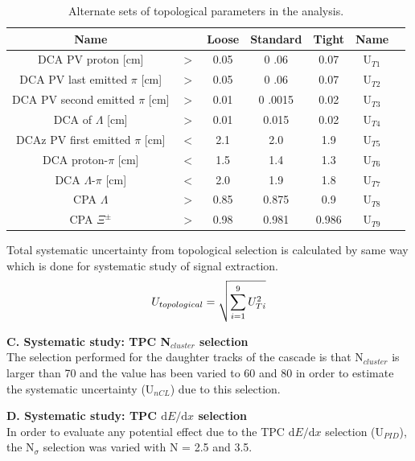 \begin{table}[htp]
\begin{center}
\begin{tabular}{|c|c|c|c|c|c|c|}
\hline
Name &  & Loose  &   Standard & Tight & Name\\
\hline
\hline

DCA PV proton [cm]& $>$ & 0.05 & 0 .06 & 0.07 & U$_{T1}$\\
\hline
DCA PV last emitted $\pi$ [cm]& $>$& 0.05 & 0 .06 & 0.07& U$_{T2}$\\
 \hline
 DCA PV second emitted $\pi$ [cm]& $>$& 0.01 & 0 .0015 & 0.02& U$_{T3}$\\
 \hline
 DCA of $\Lambda$ [cm]& $>$ & 0.01 & 0.015 & 0.02& U$_{T4}$\\
 \hline
  DCAz PV first emitted $\pi$ [cm]& $ < $& 2.1 & 2.0 & 1.9& U$_{T5}$\\
 \hline
 DCA  proton-$\pi$ [cm]& $<$ & 1.5 & 1.4 & 1.3& U$_{T6}$\\
 \hline
 DCA  $\Lambda$-$\pi$ [cm]& $<$ & 2.0 & 1.9 & 1.8& U$_{T7}$\\
 \hline
 CPA  $\Lambda$& $>$ & 0.85 & 0.875 & 0.9& U$_{T8}$\\
 \hline
 CPA  $\Xi^{\pm}$& $>$ & 0.98 & 0.981 & 0.986& U$_{T9}$\\
 \hline
\end{tabular}
\caption{Alternate sets of topological parameters in the analysis.}\label{table:topologylist}
\end{center}
\end{table}%


Total systematic uncertainty from topological selection is calculated by same way which is done for systematic study of signal extraction.
\begin{equation}
U_{topological} = \sqrt{\sum_{i=1}^{9}{U_{T{\it{i}}}^{2}}}\label{eq:topo}
\end{equation}

\textbf{C. Systematic study: TPC N$_{cluster}$ selection }\\
The selection performed for the daughter tracks of the cascade is that N$_{cluster}$ is larger than 70 and the value has been varied to 60 and 80 in order to estimate the systematic uncertainty (U$_{nCL}$) due to this selection. 

\textbf{D. Systematic study: TPC $\mathrm{d}E/\mathrm{d}x$ selection}\\
In order to evaluate any potential effect due to the TPC $\mathrm{d}E/\mathrm{d}x$ selection (U$_{PID}$), the N$_{\sigma}$ selection was varied with N = 2.5 and 3.5. 

